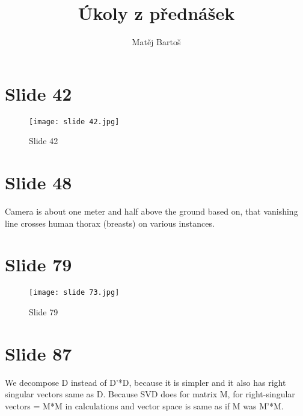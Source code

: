 \documentclass[a4]{article}
\title{Úkoly z přednášek}
\author{Matěj Bartoš}
\begin{document}
\maketitle

\section{Slide 42}
\begin{figure}[ht!]
	\centering
	\texttt{[image: slide 42.jpg]}
	\caption{Slide 42}
\end{figure}
\section{Slide 48}
Camera is about one meter and half above the ground based on,
that vanishing line crosses human thorax (breasts) on various instances.

\section{Slide 79}
\begin{figure}[ht!]
	\centering
	\texttt{[image: slide 73.jpg]}
	\caption{Slide 79}
\end{figure}
\section{Slide 87}
We decompose D instead of D'*D, because it is simpler
and it also has right singular vectors same as D.
Because SVD does for matrix M,
for right-singular vectors = M*M in calculations and
vector space is same as if M was M'*M.
\end{document}

